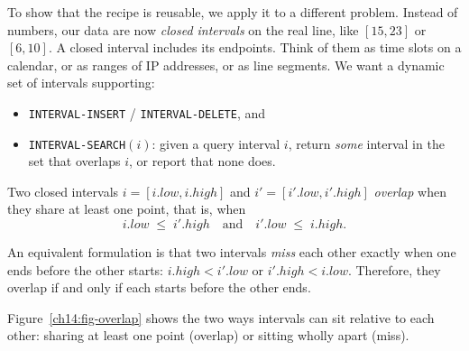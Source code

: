 To show that the recipe is reusable, we apply it to a different problem. Instead of numbers, our data are now \emph{closed intervals} on the real
line, like $[15, 23]$ or $[6, 10]$. A closed interval includes its endpoints. Think of them as time slots on a calendar, or
as ranges of IP addresses, or as line segments. We want a dynamic set of
intervals supporting:

\begin{itemize}
  \item \texttt{INTERVAL-INSERT} / \texttt{INTERVAL-DELETE}, and
  \item \texttt{INTERVAL-SEARCH}$(i)$: given a query interval $i$, return
    \emph{some} interval in the set that overlaps $i$, or report that none does.
\end{itemize}

\begin{definition}[Overlap]
\label{ch14:overlap-def}
Two closed intervals $i = [i.\mathit{low}, i.\mathit{high}]$ and
$i' = [i'.\mathit{low}, i'.\mathit{high}]$ \emph{overlap} when they share at least
one point, that is, when
\[
  i.\mathit{low} \;\le\; i'.\mathit{high}
  \quad\text{and}\quad
  i'.\mathit{low} \;\le\; i.\mathit{high}.
\]
\end{definition}

\begin{focusbox}
An equivalent formulation is that two intervals \emph{miss} each other exactly
when one ends before the other starts: $i.\mathit{high} < i'.\mathit{low}$ or
$i'.\mathit{high} < i.\mathit{low}$. Therefore, they overlap if and only if each
starts before the other ends.
\end{focusbox}

Figure~\ref{ch14:fig-overlap} shows the two ways intervals can sit relative to
each other: sharing at least one point (overlap) or sitting wholly apart (miss).

